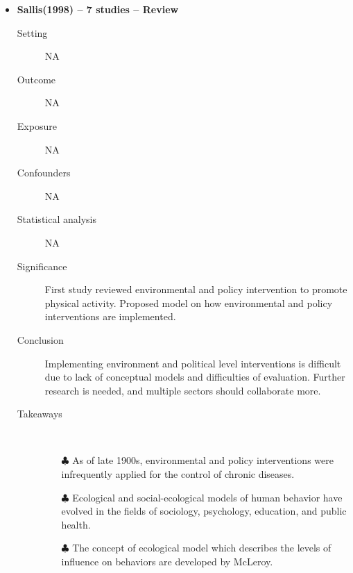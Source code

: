 \documentclass{article}
\begin{document}
\begin{itemize}
\begin{description}
		\end{description}

\newpage
\item{\bf Sallis(1998) -- 7 studies  -- Review} 
		\begin{description}
			\item[Setting] NA 
			\item[Outcome] NA 
			\item[Exposure] NA 
			\item[Confounders] NA 
			\item[Statistical analysis] NA 
			\item[Significance] First study reviewed environmental and policy intervention to promote physical activity. Proposed model on how environmental and policy interventions are implemented.  
			\item[Conclusion] Implementing environment and political level interventions is difficult due to lack of conceptual models and difficulties of evaluation. Further research is needed, and multiple sectors should collaborate more. 
			\item[Takeaways] \mbox{}\\
				\begin{itemize}
					\item[$\clubsuit$] As of late 1900s, environmental and policy interventions were infrequently applied for the control of chronic diseases. 
					\item[$\clubsuit$] Ecological and social-ecological models of human behavior have evolved in the fields of sociology, psychology, education, and public health. 
					\item[$\clubsuit$] The concept of ecological model which describes the levels of influence on behaviors are developed by McLeroy. 
				\end{itemize} 
			
		\end{description}


\end{itemize}
\end{document}
